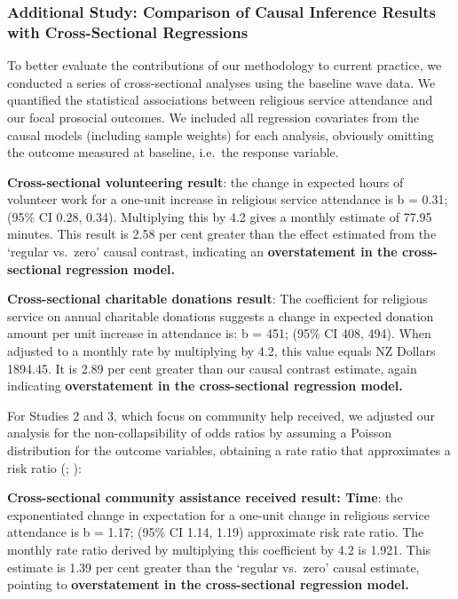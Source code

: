 \documentclass[
  single column]{article}
\begin{document}
\newpage{}

\subsubsection{Additional Study: Comparison of Causal Inference Results
with Cross-Sectional
Regressions}\label{additional-study-comparison-of-causal-inference-results-with-cross-sectional-regressions}

To better evaluate the contributions of our methodology to current
practice, we conducted a series of cross-sectional analyses using the
baseline wave data. We quantified the statistical associations between
religious service attendance and our focal prosocial outcomes. We
included all regression covariates from the causal models (including
sample weights) for each analysis, obviously omitting the outcome
measured at baseline, i.e.~the response variable.

\textbf{Cross-sectional volunteering result}: the change in expected
hours of volunteer work for a one-unit increase in religious service
attendance is b = 0.31; (95\% CI 0.28, 0.34). Multiplying this by 4.2
gives a monthly estimate of 77.95 minutes. This result is 2.58 per cent
greater than the effect estimated from the `regular vs.~zero' causal
contrast, indicating an \textbf{overstatement in the cross-sectional
regression model.}

\textbf{Cross-sectional charitable donations result}: The coefficient
for religious service on annual charitable donations suggests a change
in expected donation amount per unit increase in attendance is: b = 451;
(95\% CI 408, 494). When adjusted to a monthly rate by multiplying by
4.2, this value equals NZ Dollars 1894.45. It is 2.89 per cent greater
than our causal contrast estimate, again indicating
\textbf{overstatement in the cross-sectional regression model.}

For Studies 2 and 3, which focus on community help received, we adjusted
our analysis for the non-collapsibility of odds ratios by assuming a
Poisson distribution for the outcome variables, obtaining a rate ratio
that approximates a risk ratio
(; ):

\textbf{Cross-sectional community assistance received result: Time}: the
exponentiated change in expectation for a one-unit change in religious
service attendance is b = 1.17; (95\% CI 1.14, 1.19) approximate risk
rate ratio. The monthly rate ratio derived by multiplying this
coefficient by 4.2 is 1.921. This estimate is 1.39 per cent greater than
the `regular vs.~zero' causal estimate, pointing to
\textbf{overstatement in the cross-sectional regression model.}
\end{document}
